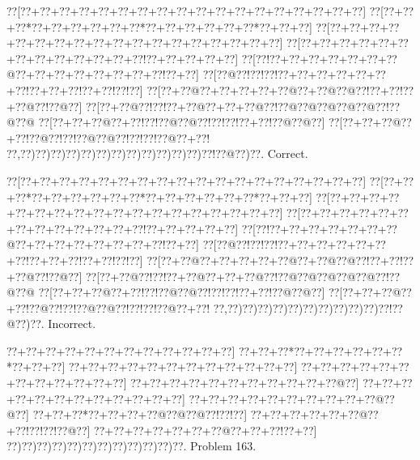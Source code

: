 \documentclass[a5paper]{article}
\begin{document}
\begin{center}
{\goo
\0??[\0??+\0??+\0??+\0??+\0??+\0??+\0??+\0??+\0??+\0??+\0??+\0??+\0??+\0??+\0??+\0??+\0??+\0??]
\0??[\0??+\0??+\0??*\0??+\0??+\0??+\0??+\0??+\0??*\0??+\0??+\0??+\0??+\0??+\0??*\0??+\0??+\0??]
\0??[\0??+\0??+\0??+\0??+\0??+\0??+\0??+\0??+\0??+\0??+\0??+\0??+\0??+\0??+\0??+\0??+\0??+\0??]
\0??[\0??+\0??+\0??+\0??+\0??+\0??+\0??+\0??+\0??+\0??+\0??+\0??+\0??!\0??+\0??+\0??+\0??+\0??]
\0??[\0??!\0??+\0??+\0??+\0??+\0??+\0??+\0??@\0??+\0??+\0??+\0??+\0??+\0??+\0??+\0??!\0??+\0??]
\0??[\0??@\0??!\0??!\0??!\0??+\0??+\0??+\0??+\0??+\0??+\0??!\0??+\0??+\0??!\0??+\0??!\0??!\0??]
\0??[\0??+\0??@\0??+\0??+\0??+\0??+\0??@\0??+\0??@\0??@\0??!\0??+\0??!\0??+\0??@\0??!\0??@\0??]
\0??[\0??+\0??@\0??!\0??!\0??+\0??@\0??+\0??+\0??@\0??!\0??@\0??@\0??@\0??@\0??@\0??!\0??@\0??@
\0??[\0??+\0??+\0??@\0??+\0??!\0??!\0??@\0??@\0??!\0??!\0??!\0??+\0??!\0??@\0??@\0??]
\0??[\0??+\0??+\0??@\0??+\0??!\0??@\0??!\0??!\0??@\0??@\0??!\0??!\0??!\0??@\0??+\0??!
\0??,\0??)\0??)\0??)\0??)\0??)\0??)\0??)\0??)\0??)\0??)\0??)\0??)\0??!\0??@\0??)\0??.
}
Correct. 

\end{center}
\begin{center}
{\goo
\0??[\0??+\0??+\0??+\0??+\0??+\0??+\0??+\0??+\0??+\0??+\0??+\0??+\0??+\0??+\0??+\0??+\0??+\0??]
\0??[\0??+\0??+\0??*\0??+\0??+\0??+\0??+\0??+\0??*\0??+\0??+\0??+\0??+\0??+\0??*\0??+\0??+\0??]
\0??[\0??+\0??+\0??+\0??+\0??+\0??+\0??+\0??+\0??+\0??+\0??+\0??+\0??+\0??+\0??+\0??+\0??+\0??]
\0??[\0??+\0??+\0??+\0??+\0??+\0??+\0??+\0??+\0??+\0??+\0??+\0??+\0??!\0??+\0??+\0??+\0??+\0??]
\0??[\0??!\0??+\0??+\0??+\0??+\0??+\0??+\0??@\0??+\0??+\0??+\0??+\0??+\0??+\0??+\0??!\0??+\0??]
\0??[\0??@\0??!\0??!\0??!\0??+\0??+\0??+\0??+\0??+\0??+\0??!\0??+\0??+\0??!\0??+\0??!\0??!\0??]
\0??[\0??+\0??@\0??+\0??+\0??+\0??+\0??@\0??+\0??@\0??@\0??!\0??+\0??!\0??+\0??@\0??!\0??@\0??]
\0??[\0??+\0??@\0??!\0??!\0??+\0??@\0??+\0??+\0??@\0??!\0??@\0??@\0??@\0??@\0??@\0??!\0??@\0??@
\0??[\0??+\0??+\0??@\0??+\0??!\0??!\0??@\0??@\0??!\0??!\0??!\0??+\0??!\0??@\0??@\0??]
\0??[\0??+\0??+\0??@\0??+\0??!\0??@\0??!\0??!\0??@\0??@\0??!\0??!\0??!\0??@\0??+\0??!
\0??,\0??)\0??)\0??)\0??)\0??)\0??)\0??)\0??)\0??)\0??)\0??!\0??@\0??)\0??.
}
Incorrect. 

\end{center}
\newpage
\begin{center}
{\goo
\0??+\0??+\0??+\0??+\0??+\0??+\0??+\0??+\0??+\0??+\0??+\0??]
\0??+\0??+\0??*\0??+\0??+\0??+\0??+\0??+\0??*\0??+\0??+\0??]
\0??+\0??+\0??+\0??+\0??+\0??+\0??+\0??+\0??+\0??+\0??+\0??]
\0??+\0??+\0??+\0??+\0??+\0??+\0??+\0??+\0??+\0??+\0??+\0??]
\0??+\0??+\0??+\0??+\0??+\0??+\0??+\0??+\0??+\0??+\0??@\0??]
\0??+\0??+\0??+\0??+\0??+\0??+\0??+\0??+\0??+\0??+\0??+\0??]
\0??+\0??+\0??+\0??+\0??+\0??+\0??+\0??+\0??+\0??@\0??@\0??]
\0??+\0??+\0??*\0??+\0??+\0??+\0??@\0??@\0??@\0??!\0??!\0??]
\0??+\0??+\0??+\0??+\0??+\0??@\0??+\0??!\0??!\0??!\0??@\0??]
\0??+\0??+\0??+\0??+\0??+\0??+\0??@\0??+\0??+\0??!\0??+\0??]
\0??)\0??)\0??)\0??)\0??)\0??)\0??)\0??)\0??)\0??)\0??)\0??.
}
Problem 163.

\end{center}
\end{document}
